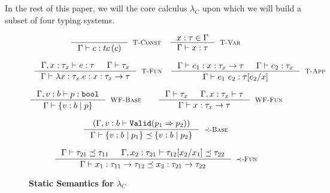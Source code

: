 In the rest of this paper, we will the core calculus $\lambda_C$
upon which we will build a subset of four typing systems\cite{TODO}.


\begin{figure}[ht!]
\medskip {}

\begin{comment}
$$\begin{array}{cc}

\inference
  {  \hastype{\Gamma}{e}{\tau_2} && \isSubType{\Gamma}{\tau_2}{\tau_1} 
  && \isWellFormed{\Gamma}{\tau_1}
  }
  {\hastype{\Gamma}{e}{\tau_1}}
  [\tsub]
\end{array}$$
\end{comment}
$$\begin{array}{cc}

\inference
  {}
  {\hastype{\Gamma}{c}{\tc{c}}}
  [\tconst]
&
\inference
  {x:\tau \in \Gamma}
  {\hastype{\Gamma}{x}{\tau}} 
  [\tvariable]

\end{array}$$

$$\begin{array}{cc}

\inference
  {\hastype{\Gamma, x:\tau_x}{e}{\tau} &&     
  \isWellFormed{\Gamma}{\tau_x}
  }
  {\hastype{\Gamma}{\efunt{x}{\tau_x}{e}}{\tfun{x}{\tau_x}{\tau}}}
  [\tfunction]
&
\inference
  {\hastype{\Gamma}{e_1}{\tfun{x}{\tau_x}{\tau}} &&
   \hastype{\Gamma}{e_2}{\tau_x}
  }
  {\hastype{\Gamma}{\eapp{e_1}{e_2}}{\tau[e_2/x]}} 
  [\tapp]

\end{array}$$


$$\inference
    {\hastype{\Gamma, v:b}{p}{\tbbool}}
    {\isWellFormed{\Gamma}{\tref{b}{p}}}
    [\wtBase]
\qquad
\inference
    {
    \isWellFormed{\Gamma}{\tau_x} &&
	\isWellFormed{\Gamma, x:\tau_x}{\tau}
    }
    {\isWellFormed{\Gamma}{\tfun{x}{\tau_x}{\tau}}}
    [\wtFun]
$$


\medskip {}

$$
\inference
   {(\Gamma, v:b \vdash \texttt{Valid}(p_1 \Rightarrow p_2))}
   {\isSubType{\Gamma}{\tref{b}{p_1}}{\tref{b}{p_2}}}
   [\tsubBase]
$$

$$
\inference
   {\isSubType{\Gamma}{\tau_{21}}{\tau_{11}} &
	\isSubType{\Gamma, x_2:{\tau_{21}}}{\SUBST{\tau_{12}}{x_1}{x_2}}{\tau_{22}}	
   }
   {\isSubType{\Gamma}
	  {\tfun{x_1}{\tau_{11}}{\tau_{12}}}
	  {\tfun{x_2}{\tau_{21}}{\tau_{22}}}
}[\tsubFun]
$$



\caption{\textbf{Static Semantics for $\lambda_C$}}
\label{fig:rules}
\end{figure}